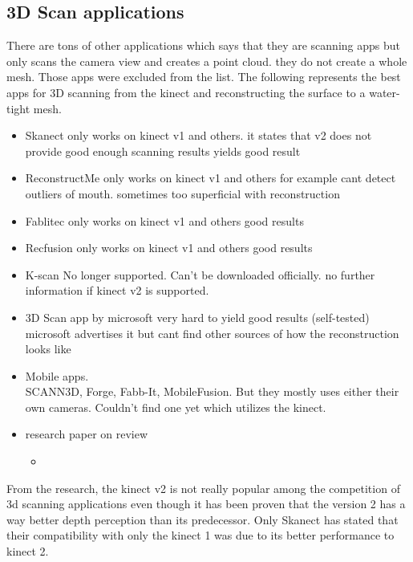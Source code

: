 \subsection{3D Scan applications}
There are tons of other applications which says that they are scanning apps but only scans the camera view and creates a point cloud. they do not create a whole mesh. Those apps were excluded from the list. The following represents the best apps for 3D scanning from the kinect and reconstructing the surface to a water-tight mesh.
\begin{itemize}
\item Skanect
only works on kinect v1  and others. it states that v2 does not provide good enough scanning results
yields good result
\item ReconstructMe
only works on kinect v1  and others
for example cant detect outliers of mouth. sometimes too superficial with reconstruction
\item Fablitec 
only works on kinect v1 and others
good results
\item Recfusion
only works on kinect v1 and others
good results
\item K-scan
No longer supported. Can’t be downloaded officially. no further information if kinect v2 is supported.
\item 3D Scan app by microsoft
very hard to yield good results (self-tested)
microsoft advertises it but cant find other sources of how the reconstruction looks like
\item Mobile apps.\\SCANN3D, Forge, Fabb-It, MobileFusion. But they mostly uses either their own cameras. Couldn’t find one yet which utilizes the kinect.
\item research paper on review
\begin{itemize}
\item 
\end{itemize}
\end{itemize}

From the research, the kinect v2 is not really popular among the competition of 3d scanning applications even though it has been proven that the version 2 has a way better depth perception than its predecessor. Only Skanect has stated that their compatibility with only the kinect 1 was due to its better performance to kinect 2.